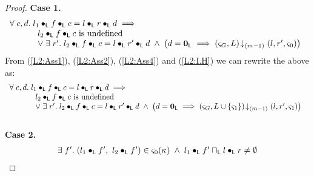 \begin{lemma}[]
\begin{proof}
\noindent\textbf{Case 1.} 
%
\[
\begin{array}{l}
	\forall\; c, d.\;  l_1 \bullet_{\textsf{L}} f \bullet_{\textsf{L}} c = l \bullet_{\textsf{L}} r \bullet_{\textsf{L}} d \implies\\
	\hspace*{1cm}
	\begin{array}{l l}
		l_2 \bullet_{\textsf{L}} f \bullet_{\textsf{L}} c \text{ is undefined}\\
		\lor\; \exists\; r'.\; l_2 \bullet_{\textsf{L}} f \bullet_{\textsf{L}} c = l \bullet_{\textsf{L}} r' \bullet_{\textsf{L}} d \;\land\; \left(d = \mathbf{0}_{\textsf{L}} \implies \left(\varsigma_{G}, L\right) \!\downarrow_{(m-1)} \left(l, r', \varsigma_{0}\right)\right)
	\end{array}
\end{array}
\]
%
From (\ref{L2:Ass1}), (\ref{L2:Ass2}), (\ref{L2:Ass4}) and (\ref{L2:I.H}) we can rewrite the above as:
%
\begin{align}
\begin{array}{l}
	\forall\; c, d.\;  l_1 \bullet_{\textsf{L}} f \bullet_{\textsf{L}} c = l \bullet_{\textsf{L}} r \bullet_{\textsf{L}} d \implies\\
	\hspace*{1cm}
	\begin{array}{l l}
		l_2 \bullet_{\textsf{L}} f \bullet_{\textsf{L}} c \text{ is undefined}\\
		\lor\; \exists\; r'.\; l_2 \bullet_{\textsf{L}} f \bullet_{\textsf{L}} c = l \bullet_{\textsf{L}} r' \bullet_{\textsf{L}} d \;\land\; \left( d = \mathbf{0}_{\textsf{L}} \implies  \left(\varsigma_{G}, L \cup \{\varsigma_{1}\}\right) \!\downarrow_{(m-1)} \left(l, r', \varsigma_{1}\right)\right)
	\end{array}
\end{array}\label{L2:Case1}
\end{align}\\

%
%
%
%
\noindent\textbf{Case 2.} 
%
\[
\begin{array}{l}
		\exists\; f'.\; (l_1 \bullet_{\textsf{L}} f',\ l_2 \bullet_{\textsf{L}} f') \in \varsigma_{0}(\kappa_{}) \;\land\; l_1 \bullet_{\textsf{L}} f' \sqcap_{\textsf{L}} l \bullet_{\textsf{L}} r \not= \emptyset \\


\end{array}\]
\end{proof}
\end{lemma}
